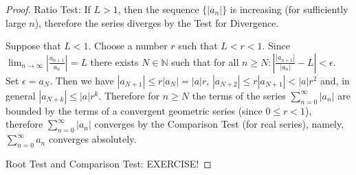 \begin{proof}
    Ratio Test: If $L > 1$, then the sequence $\{|a_n|\}$ is increasing (for sufficiently large $n$), therefore the series diverges by the Test for Divergence.
    
    Suppose that $L < 1$. Choose a number $r$ such that $L < r < 1$. Since $\lim_{n \to \infty} \left| \frac{a_{n+1}}{a_n} \right| = L$ there exists $N \in \mathbb{N}$ such that for all $n \geq N: \left| \frac{|a_{n+1}|}{|a_n|} - L \right| < \epsilon$. Set $\epsilon = a_N$. Then we have $|a_{N+1}| \leq r|a_N| = |a|r$, $|a_{N+2}| \leq r|a_{N+1}| < |a|r^2$ and, in general $|a_{N+k}| \leq |a|r^k$. Therefore for $n \geq N$ the terms of the series $\sum_{n=0}^{\infty} |a_n|$ are bounded by the terms of a convergent geometric series (since $0 \leq r < 1$), therefore $\sum_{n=0}^{\infty} |a_n|$ converges by the Comparison Test (for real series), namely, $\sum_{n=0}^{\infty} a_n$ converges absolutely.
    
    Root Test and Comparison Test: EXERCISE!
\end{proof}

